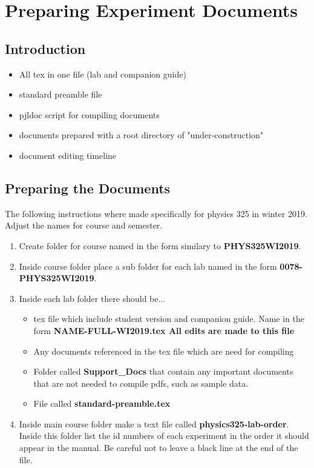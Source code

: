 \documentclass[justified]{book}
\begin{document}
\chapter{Preparing Experiment Documents}

\section{Introduction}
\begin{itemize}
\item All tex in one file (lab and companion guide)
\item standard preamble file
\item pjldoc script for compiling documents
\item documents prepared with a root directory of "under-construction"
\item document editing timeline
\end{itemize}


\section{Preparing the Documents}

The following instructions where made specifically for physics 325 in winter 2019. Adjust the names for course and semester.

\begin{enumerate}
\item Create folder for course named in the form similary to {\bf PHYS325WI2019}.

\item Inside course folder place a sub folder for each lab named in the form {\bf 0078-PHYS325WI2019}.

\item Inside each lab folder there should be...
	\begin{itemize}
	\item tex file which include student version and companion 	guide. Name in the form { \bf NAME-FULL-WI2019.tex All edits are made to this file}
	\item Any documents referenced in the tex file which are need for compiling
	\item Folder called {\bf Support\_Docs} that contain any important documents that are not needed to compile pdfs, such as sample data.
	\item File called {\bf standard-preamble.tex}
	
	\end{itemize}
\item Inside main course folder make a text file called {\bf physics325-lab-order}. Inside this folder list the id numbers of each experiment in the order it should appear in the manual. Be careful not to leave a black line at the end of the file.
\end{enumerate}
\end{document}
